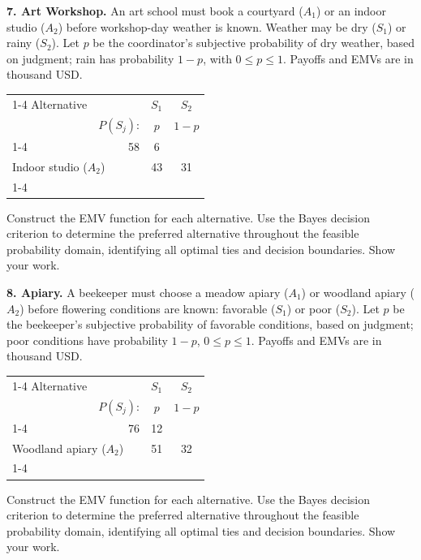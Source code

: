 \newpage

\noindent\begin{minipage}[t][0.48\textheight][t]{\textwidth}
\textbf{7. Art Workshop.} An art school must book a courtyard ($A_1$) or an indoor studio ($A_2$)
before workshop-day weather is known. Weather may be dry ($S_1$) or rainy
($S_2$). Let $p$ be the coordinator's subjective probability of dry weather,
based on judgment; rain has probability $1-p$, with $0\leq p\leq1$.
Payoffs and EMVs are in thousand USD.

\begin{center}
		\renewcommand{\arraystretch}{1.3}
		\small
		\begin{tabular}{lr@{\qquad}cc}
			\cmidrule{1-4}
			Alternative & & $S_1$ & $S_2$ \\
			& $P(S_j)$: & $p$ & $1-p$ \\
			\cmidrule{1-4}
			\multicolumn{2}{l}{Courtyard ($A_1$)} & 58 & 6 \\
			\multicolumn{2}{l}{Indoor studio ($A_2$)} & 43 & 31 \\
			\cmidrule{1-4}
		\end{tabular}
	\end{center}

Construct the EMV function for each alternative. Use the Bayes decision criterion to determine the preferred alternative throughout the feasible probability domain, identifying all optimal ties and decision boundaries. Show your work.
\par\vfill
\end{minipage}\par

\noindent\begin{minipage}[t][0.48\textheight][t]{\textwidth}
\textbf{8. Apiary.} A beekeeper must choose a meadow apiary ($A_1$) or woodland apiary
($A_2$) before flowering conditions are known: favorable ($S_1$) or
poor ($S_2$). Let $p$ be the beekeeper's subjective probability of
favorable conditions, based on judgment; poor conditions have probability
$1-p$, $0\leq p\leq1$. Payoffs and EMVs are in thousand USD.

\begin{center}
		\renewcommand{\arraystretch}{1.3}
		\small
		\begin{tabular}{lr@{\qquad}cc}
			\cmidrule{1-4}
			Alternative & & $S_1$ & $S_2$ \\
			& $P(S_j)$: & $p$ & $1-p$ \\
			\cmidrule{1-4}
			\multicolumn{2}{l}{Meadow apiary ($A_1$)} & 76 & 12 \\
			\multicolumn{2}{l}{Woodland apiary ($A_2$)} & 51 & 32 \\
			\cmidrule{1-4}
		\end{tabular}
	\end{center}

Construct the EMV function for each alternative. Use the Bayes decision criterion to determine the preferred alternative throughout the feasible probability domain, identifying all optimal ties and decision boundaries. Show your work.
\par\vfill
\end{minipage}\par

